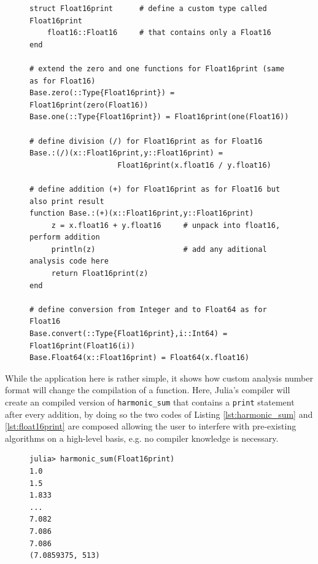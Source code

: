 \begin{figure}[tbhp]
\begin{lstlisting}[language=JuliaLocal, label=lst:float16print, caption={\textbf{Minimal example of the definition of a new custom analysis
number format \texttt{Float16print} in Julia.} The number format behaves like Float16 and defines all operations needed for \texttt{harmonic\_sum}
but the addition is extended with a \texttt{print} statement that helps to analyse code without changing \texttt{harmonic\_sum} itself.}]
struct Float16print      # define a custom type called Float16print
    float16::Float16     # that contains only a Float16
end

# extend the zero and one functions for Float16print (same as for Float16)
Base.zero(::Type{Float16print}) = Float16print(zero(Float16))
Base.one(::Type{Float16print}) = Float16print(one(Float16))

# define division (/) for Float16print as for Float16
Base.:(/)(x::Float16print,y::Float16print) =
					Float16print(x.float16 / y.float16)

# define addition (+) for Float16print as for Float16 but also print result
function Base.:(+)(x::Float16print,y::Float16print)
     z = x.float16 + y.float16     # unpack into float16, perform addition
     println(z)                    # add any aditional analysis code here
     return Float16print(z)
end

# define conversion from Integer and to Float64 as for Float16
Base.convert(::Type{Float16print},i::Int64) = Float16print(Float16(i))
Base.Float64(x::Float16print) = Float64(x.float16)
\end{lstlisting}
\end{figure}

While the application here is rather simple, it shows how custom analysis number format will change the compilation of a function. Here,
Julia's compiler will create an compiled version of \texttt{harmonic\_sum} that contains a \texttt{print} statement after
every addition, by doing so the two codes of Listing \ref{lst:harmonic_sum} and \ref{lst:float16print} are composed allowing the user
to interfere with pre-existing algorithms on a high-level basis, e.g. no compiler knowledge is necessary.

\begin{figure}[tbhp]
\begin{lstlisting}[language=JuliaLocal, label=lst:harmonic_sum_float16print, caption={\textbf{Analysing the function \texttt{harmonic\_sum} with the
new custom number format \texttt{Float16print}.} Executing \texttt{harmonic\_sum} with \texttt{Float16print} triggers a \texttt{print} statement
on every addition, i.e. after every term of the harmonic sum, but any other additional code can be executed too. Analysis number formats can
be used to investigate even complicated algorithms without explicitly changing them.}]
julia> harmonic_sum(Float16print)
1.0
1.5
1.833
...
7.082
7.086
7.086
(7.0859375, 513)
\end{lstlisting}
\end{figure}

